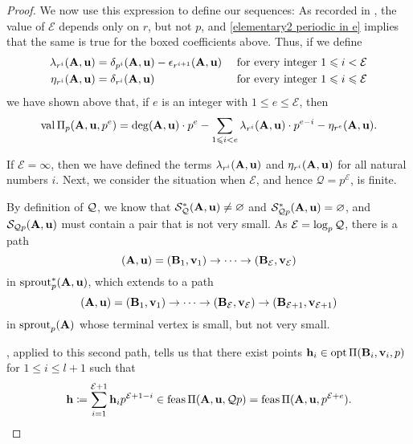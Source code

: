 \documentclass{amsart}
\begin{document}
\begin{proof}
   We now use this expression to define our sequences:  As recorded in , the value of $\mathcal{E}$ depends only on $r$, but not $p$, and \eqref{elementary2 periodic in e} implies that the same is true for the boxed coefficients above.  Thus, if we define 
   \begin{align*}
   \lambda_{r^i}(\mathbf{A}, \mathbf{u}) & = \delta_{p^i}(\mathbf{A}, \mathbf{u}) - \epsilon_{r^{i+1}}(\mathbf{A}, \mathbf{u}) & \text{ for every integer } 1 \leqslant i  < \mathcal{E} \\ 
   \eta_{r^i}(\mathbf{A}, \mathbf{u}) & = \delta_{r^i}(\mathbf{A}, \mathbf{u}) & \text{ for every integer } 1 \leqslant i \leqslant \mathcal{E}
  \end{align*}   
   we have shown above that, if $e$ is an integer with $1 \leq e \leq \mathcal{E}$, then
   \begin{equation}
   \label{val-up-to-curly-e-via-two-sequences: e}
   \operatorname{val} \Pi_p(\mathbf{A},\mathbf{u},p^e) = \deg(\mathbf{A}, \mathbf{u}) \cdot p^e - \sum_{1 \leqslant i < e} \lambda_{r^i}(\mathbf{A}, \mathbf{u}) \cdot p^{e-i} - {\eta_{r^e}(\mathbf{A}, \mathbf{u})}.
   \end{equation}
   
   If $\mathcal{E} = \infty$, then we have defined the terms $\lambda_{r^i}(\mathbf{A}, \mathbf{u})$ and $\eta_{r^i}(\mathbf{A}, \mathbf{u})$ for all natural numbers $i$. Next, we consider the situation when $\mathcal{E}$, and hence $\mathcal{Q} = p^{\mathcal{E}}$, is finite.
   
   By definition of $\mathcal{Q}$, we know that $\mathcal{S}_{\mathcal{Q}}^{\ast}(\mathbf{A},\mathbf{u}) \neq \varnothing$ and $\mathcal{S}^{\ast}_{\mathcal{Q} p}(\mathbf{A},\mathbf{u}) = \varnothing$, and $\mathcal{S}_{\mathcal{Q} p}(\mathbf{A},\mathbf{u})$ must contain a pair that is not very small.  As $\mathcal{E} = \log_p \mathcal{Q}$, there is a path
   \begin{equation}\label{eq: first path}
      (\mathbf{A},\mathbf{u}) = (\mathbf{B}_1,\mathbf{v}_1) \to \cdots \to (\mathbf{B}_{\mathcal{E}}, \mathbf{v}_{\mathcal{E}})
   \end{equation}
   in $\operatorname{sprout}_p^{\ast}(\mathbf{A},\mathbf{u})$, which extends to a path
   \[
      (\mathbf{A},\mathbf{u}) = (\mathbf{B}_1,\mathbf{v}_1) \to \cdots \to (\mathbf{B}_{\mathcal{E}}, \mathbf{v}_{\mathcal{E}}) \to (\mathbf{B}_{\mathcal{E}+1}, \mathbf{v}_{\mathcal{E}+1})
   \]
   in $\operatorname{sprout}_p(\mathbf{A})$ whose terminal vertex is small, but not very small.
   
   , applied to this second path, tells us that there exist points $\mathbf{h}_i \in \operatorname{opt} \Pi(\mathbf{B}_i, \mathbf{v}_i, p)$ for $1\le i\le l+1$ such that
   \[
      \mathbf{h} \coloneqq \sum_{i=1}^{\mathcal{E}+1} \mathbf{h}_i p^{\mathcal{E}+1-i} \in \operatorname{feas} \Pi(\mathbf{A},\mathbf{u}, \mathcal{Q} p) = \operatorname{feas} \Pi(\mathbf{A},\mathbf{u}, p^{\mathcal{E}+e}).
   \] 
   

\end{proof}
\end{document}
